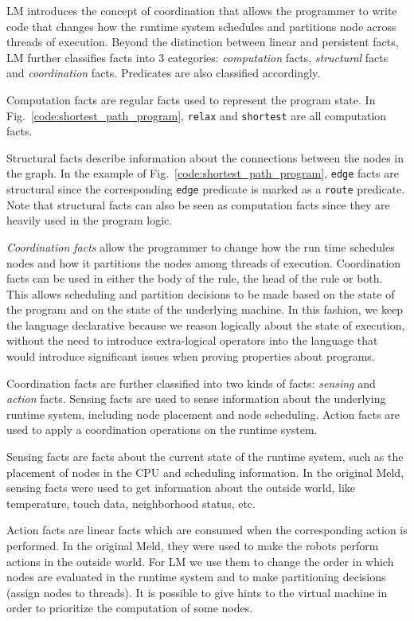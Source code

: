 LM introduces the concept of coordination that allows the programmer to write
code that changes how the runtime system schedules and partitions node across
threads of execution. Beyond the distinction between linear and persistent
facts, LM further classifies facts into 3 categories: \emph{computation} facts,
\emph{structural} facts and \emph{coordination} facts.
Predicates are also classified accordingly.

Computation facts are regular facts used to represent the program state. In
Fig.~\ref{code:shortest_path_program}, \texttt{relax} and \texttt{shortest} are
all computation facts.

Structural facts describe information about the connections between the nodes in
the graph.  In the example of Fig.~\ref{code:shortest_path_program},
\texttt{edge} facts are structural since the corresponding \texttt{edge}
predicate is marked as a \texttt{route} predicate. Note that structural facts
can also be seen as computation facts since they are heavily used in the program
logic.

\emph{Coordination facts} allow the programmer to change how the run time
schedules nodes and how it partitions the nodes among threads of execution.
Coordination facts can be used in either the body of the rule, the head of the
rule or both.  This allows scheduling and partition decisions to be made based
on the state of the program and on the state of the underlying machine.  In this
fashion, we keep the language declarative because we reason logically about the
state of execution, without the need to introduce extra-logical operators into
the language that would introduce significant issues when proving properties
about programs.

Coordination facts are further classified into two kinds of facts:
\emph{sensing} and \emph{action} facts. Sensing facts are used to sense
information about the underlying runtime system, including node placement and
node scheduling.  Action facts are used to apply a coordination operations on
the runtime system.


Sensing facts are facts about the current state of the runtime system, such as
the placement of nodes in the CPU and scheduling information. In the original
Meld, sensing facts were used to get information about the outside world, like
temperature, touch data, neighborhood status, etc.

Action facts are linear facts which are consumed when the corresponding action
is performed. In the original Meld, they were used to make the robots perform
actions in the outside world.  For LM we use them to change the order in which
nodes are evaluated in the runtime system and to make partitioning decisions
(assign nodes to threads). It is possible to give hints to the virtual machine
in order to prioritize the computation of some nodes.

